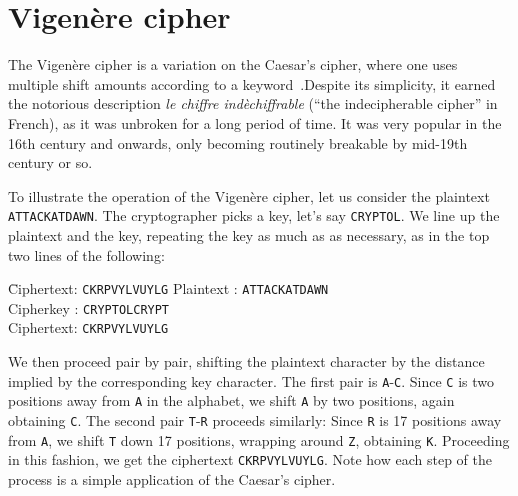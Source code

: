 \section{\texorpdfstring{Vigen\`{e}re}{Vigenere} cipher}
\label{sec:vigenere}

The Vigen\`{e}re cipher is a variation on the Caesar's cipher, where
one uses multiple shift amounts according to a
keyword~\cite{wiki:vigenere}.\indVigenere Despite its simplicity, it
earned the notorious description {\em le chiffre ind\`{e}chiffrable}
(``the indecipherable cipher'' in French), as it was unbroken for a
long period of time. It was very popular in the 16th century and
onwards, only becoming routinely breakable by mid-19th century or so.

To illustrate the operation of the Vigen\`{e}re cipher, let us
consider the plaintext {\tt ATTACKATDAWN}. The cryptographer picks a
key, let's say {\tt CRYPTOL}. We line up the plaintext and the key,
repeating the key as much as as necessary, as in the top two lines of
the following:
\begin{tabbing}
\hspace*{2cm} \= Ciphertext: \hspace*{.5cm} \= {\tt CKRPVYLVUYLG} \kill 
\> Plaintext : \> {\tt ATTACKATDAWN} \\
\> Cipherkey : \> {\tt CRYPTOLCRYPT} \\
\> Ciphertext: \> {\tt CKRPVYLVUYLG}
\end{tabbing}
We then proceed pair by pair, shifting the plaintext character by the
distance implied by the corresponding key character.  The first pair
is {\tt A}-{\tt C}.  Since {\tt C} is two positions away from {\tt A}
in the alphabet, we shift {\tt A} by two positions, again obtaining
{\tt C}.  The second pair {\tt T}-{\tt R} proceeds similarly: Since
{\tt R} is 17 positions away from {\tt A}, we shift {\tt T} down 17
positions, wrapping around {\tt Z}, obtaining {\tt K}.  Proceeding in
this fashion, we get the ciphertext {\tt CKRPVYLVUYLG}. Note how each
step of the process is a simple application of the Caesar's
cipher.\indCaesarscipher


